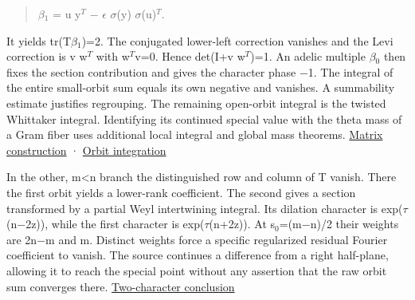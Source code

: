\documentclass[11pt,letterpaper]{article}
\begin{document}
\begin{quote}\raggedright\setlength{\parskip}{1pt}
{\ttfamily\small \ensuremath{\beta}\ensuremath{{}_{1}} = u y\ensuremath{{}^{T}} \ensuremath{-} \ensuremath{\epsilon} \allowbreak{}\ensuremath{\sigma}(y) \ensuremath{\sigma}(u)\ensuremath{{}^{T}}.\allowbreak{}}\par
\end{quote}
It yields tr(T\ensuremath{\beta}\ensuremath{{}_{1}})=2. The conjugated lower-left correction vanishes and the Levi correction is v w\ensuremath{{}^{T}} with w\ensuremath{{}^{T}}v=0. Hence det(I+v w\ensuremath{{}^{T}})=1. An adelic multiple \ensuremath{\beta}\ensuremath{{}_{0}} then fixes the section contribution and gives the character phase \ensuremath{-}1. The integral of the entire small-orbit sum equals its own negative and vanishes. A summability estimate justifies regrouping. The remaining open-orbit integral is the twisted Whittaker integral. Identifying its continued special value with the theta mass of a Gram fiber uses additional local integral and global mass theorems. \href{https://github.com/nousentllc/riemann-hypothesis/blob/40e56bab026552e089d7afcfeff08d2defb9c005/src/Development/WeilBound/CoreStatements/AutomorphicKernels/SiegelWeilFormula/UnfoldingCompactness/ExistsBetaPf.lean\#L7-L66}{Matrix construction} · \href{https://github.com/nousentllc/riemann-hypothesis/blob/40e56bab026552e089d7afcfeff08d2defb9c005/src/Development/WeilBound/CoreStatements/AutomorphicKernels/SiegelWeilFormula/UnfoldingCompactness/AbsUnf.lean\#L100-L159}{Orbit integration}

In the other, m<n branch the distinguished row and column of T vanish. There the first orbit yields a lower-rank coefficient. The second gives a section transformed by a partial Weyl intertwining integral. Its dilation character is exp(\ensuremath{\tau}(n\ensuremath{-}2z)), while the first character is exp(\ensuremath{\tau}(n+2z)). At s\ensuremath{{}_{0}}=(m\ensuremath{-}n)/2 their weights are 2n\ensuremath{-}m and m. Distinct weights force a specific regularized residual Fourier coefficient to vanish. The source continues a difference from a right half-plane, allowing it to reach the special point without any assertion that the raw orbit sum converges there. \href{https://github.com/nousentllc/riemann-hypothesis/blob/40e56bab026552e089d7afcfeff08d2defb9c005/src/Development/AutomorphicArithmetic/Foundations/GaloisRepresentations/ThetaParseval/ThetaKernels/SiegelWeilAstepDeg.lean\#L94-L124}{Two-character conclusion}
\end{document}
